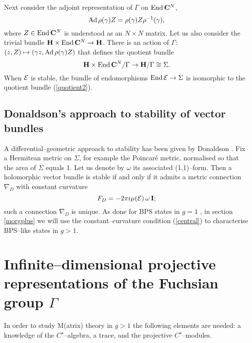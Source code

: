 \documentclass[a4paper,a4paper]{article}
\begin{document}
Next consider the adjoint representation of $\Gamma$ on ${\rm End}\,{{\bf C}}^N$,  
\begin{equation}  
{\rm Ad}\,\rho (\gamma) Z =\rho (\gamma) Z \rho^{-1}(\gamma),  
\label{aggiunta}  
\end{equation}  
where $Z\in{\rm End}\,{{\bf C}}^N$ is understood as an $N\times N$ matrix.  Let us  
also consider the trivial bundle ${{\bf H}}\times{\rm End}\,{{\bf C}}^N\rightarrow  
{{\bf H}}$. There is an action of $\Gamma$:  
$(z,Z)\mapsto(\gamma z, {\rm Ad}\,\rho(\gamma) Z)$ that defines the quotient bundle  
\begin{equation}  
{{\bf H}}\times {\rm End}\, {{\bf C}}^N/\Gamma\rightarrow  
{{\bf H}}/ \Gamma\cong\Sigma.  
\label{quotient2}
\end{equation}  
When ${\cal  E}$ is stable, the bundle of endomorphisms ${\rm End}\,  
{\cal  E}\rightarrow \Sigma$ is isomorphic to the quotient bundle  
(\ref{quotient2}).  
  
\subsection{Donaldson's approach to stability of vector  
bundles}\label{donapp}  
  
A differential--geometric approach to stability has been given by Donaldson  
\cite{DONALDSON}. Fix a Hermitean metric on $\Sigma$, for example the Poincar\'e  
metric, normalised so that the area of $\Sigma$ equals 1. Let us denote by  
$\omega$ its associated (1,1)--form. Then a holomorphic vector bundle is stable 
if and only if it admits a metric connection $\nabla_D$ with constant curvature  
\begin{equation}  
F_D=-2\pi i \mu({\cal E}) \,\omega \,{{\bf  I}};
\label{central}
\end{equation} 
such a connection $\nabla_D$ is unique. As done for BPS states in $g=1$ 
\cite{SCHWARZ}, in section \ref{morgplus} we will use the constant--curvature 
condition (\ref{central}) to characterise BPS--like states in $g>1$.  

\section{Infinite--dimensional projective representations of the Fuchsian 
group $\Gamma$}\label{gimmeanameforthis}  
 
In order to study M(atrix) theory in $g>1$ the following elements are needed: 
a knowledge of the $C^{\star}$--algebra, a trace, and the projective $C^{\star}$--modules. 
\end{document}
